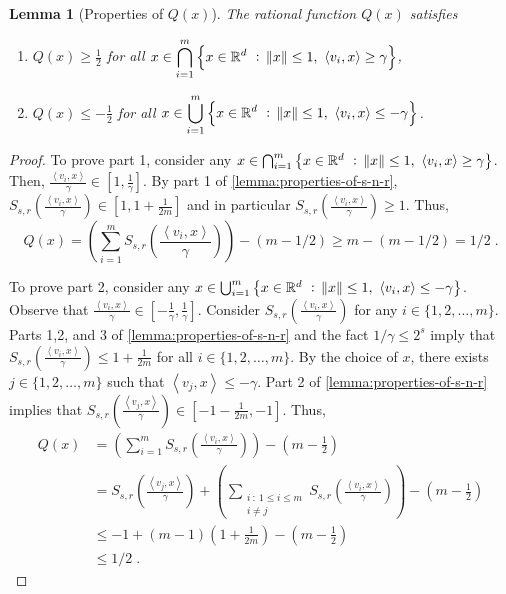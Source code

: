 \documentclass[12pt]{article}
\newtheorem{lemma}[definition]{Lemma}
\newcommand{\R}{\mathbb{R}}  %
\newcommand{\ip}[2]{\left\langle #1, #2 \right\rangle} %
\begin{document}
\begin{lemma}[Properties of $Q(x)$]
\label{lemma:properties-of-q}
The rational function $Q(x)$ satisfies
\begin{enumerate}
\item $Q(x) \ge \frac{1}{2}$ for all $\displaystyle x \in \bigcap_{i=1}^m \left\{ x \in \R^d ~:~ \norm{x} \le 1, \ \ip{v_i}{x} \ge \gamma \right\}$,
\item $Q(x) \le -\frac{1}{2}$ for all $\displaystyle x \in \bigcup_{i=1}^m \left\{ x \in \R^d ~:~ \norm{x} \le 1, \ \ip{v_i}{x} \le - \gamma \right\}$.
\end{enumerate}
\end{lemma}

\begin{proof}
To prove part 1, consider any $x \in \bigcap_{i=1}^m \left\{ x \in \R^d ~:~ \norm{x} \le 1, \
\ip{v_i}{x} \ge \gamma \right\}$. Then, $\frac{\ip{v_i}{x}}{\gamma} \in [1,
\frac{1}{\gamma}]$. By part 1 of \autoref{lemma:properties-of-s-n-r},
$S_{s,r}\left(\frac{\ip{v_i}{x}}{\gamma}\right) \in [1, 1 + \frac{1}{2m}]$ and
in particular $S_{s,r}\left(\frac{\ip{v_i}{x}}{\gamma}\right) \ge 1$. Thus,
$$
Q(x) = \left( \sum_{i=1}^m S_{s,r}\left(\frac{\ip{v_i}{x}}{\gamma}\right) \right) - (m - 1/2) \ge m - (m - 1/2) = 1/2 \; .
$$

To prove part 2, consider any $x \in \bigcup_{i=1}^m \left\{ x \in \R^d ~:~
\norm{x} \le 1, \ \ip{v_i}{x} \le - \gamma \right\}$. Observe that
$\frac{\ip{v_i}{x}}{\gamma} \in [-\frac{1}{\gamma}, \frac{1}{\gamma}]$. Consider
$S_{s,r}\left(\frac{\ip{v_i}{x}}{\gamma}\right)$ for any $i \in
\{1,2,\dots,m\}$. Parts 1,2, and 3 of \autoref{lemma:properties-of-s-n-r}
and the fact $1/\gamma \le 2^s$ imply that
$S_{s,r}\left(\frac{\ip{v_i}{x}}{\gamma}\right) \le 1 +
\frac{1}{2m}$ for all $i \in \{1,2,\dots,m\}$. By the choice of $x$, there
exists $j \in \{1,2,\dots,m\}$ such that $\ip{v_j}{x} \le - \gamma$. Part 2 of
\autoref{lemma:properties-of-s-n-r} implies that
$S_{s,r}\left(\frac{\ip{v_j}{x}}{\gamma}\right) \in [-1-\frac{1}{2m},-1]$. Thus,
\begin{align*}
Q(x)
& = \left( \sum_{i=1}^m S_{s,r}\left( \frac{\ip{v_i}{x}}{\gamma} \right) \right) - \left(m - \frac{1}{2} \right) \\
& = S_{s,r}\left( \frac{\ip{v_j}{x}}{\gamma} \right) + \left( \sum_{\substack{i ~:~ 1 \le i \le m \\ i \neq j}} S_{s,r}\left( \frac{\ip{v_i}{x}}{\gamma} \right) \right) - \left(m - \frac{1}{2} \right) \\
& \le -1 + (m-1) \left( 1 + \frac{1}{2m} \right) - \left(m - \frac{1}{2} \right) \\
& \le 1/2 \; .
\end{align*}
\end{proof}
\end{document}
